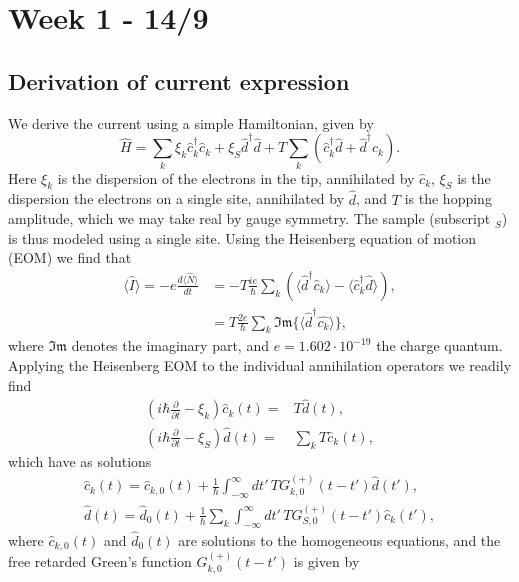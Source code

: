 \section{Week 1 - 14/9}
\subsection{Derivation of current expression}
We derive the current using a simple Hamiltonian, given by
\begin{equation}
    \hat{H} = \sum_{k}\xi_k \hat{c}^{\dagger}_k\hat{c}_k + \xi_S \hat{d}^\dagger\hat{d} + T\sum_k\left(\hat{c}^{\dagger}_k\hat{d} + \hat{d}^{\dagger}\hat{c}_k\right).
\end{equation}
Here $\xi_k$ is the dispersion of the electrons in the tip, annihilated by $\hat{c}_k$, $\xi_S$ is the dispersion the electrons on a single site, annihilated by $\hat{d}$, and $T$ is the hopping amplitude, which we may take real by gauge symmetry. The sample (subscript $_S$) is thus modeled using a single site. Using the Heisenberg equation of motion (EOM) we find that
\begin{align}
    \langle \hat{I} \rangle = -e\frac{d\langle\hat{N}\rangle}{dt} &= -T\frac{ie}{\hbar}\sum_k\left(\langle\hat{d}^\dagger\hat{c}_k\rangle - \langle \hat{c}^\dagger_k \hat{d}\rangle\right), \\
    &= T \frac{2e}{\hbar}\sum_k\mathfrak{Im} \{\langle \hat{d}^\dagger\hat{c_k} \rangle \},
\end{align}
where $\mathfrak{Im}$ denotes the imaginary part, and $e = 1.602\cdot10^{-19}$ the charge quantum. Applying the Heisenberg EOM to the individual annihilation operators we readily find
\begin{eqnarray}
    \left(i \hbar \frac{\partial}{\partial t} - \xi_k\right) \hat{c}_k(t)=&T\hat{d}(t),\\
    \left(i \hbar \frac{\partial}{\partial t} - \xi_S\right) \hat{d}(t)=&\sum_k T \hat{c}_k(t),
\end{eqnarray}
which have as solutions
\begin{eqnarray}\label{eq:c-evolution}
    \hat{c}_k(t) = \hat{c}_{k,0}(t) + \frac{1}{\hbar}\int_{-\infty}^{\infty}dt'\,TG_{k,0}^{(+)}(t-t')\hat{d}(t'), \\ \label{eq:d-evolution}
    \hat{d}(t) = \hat{d}_{0}(t) + \frac{1}{\hbar}\sum_k\int_{-\infty}^{\infty}dt'\,TG_{S,0}^{(+)}(t-t')\hat{c}_k(t'),
\end{eqnarray}
where $\hat{c}_{k,0}(t)$ and $\hat{d}_0(t)$ are solutions to the homogeneous equations, and the free retarded Green's function $G_{k,0}^{(+)}(t-t')$ is given by
